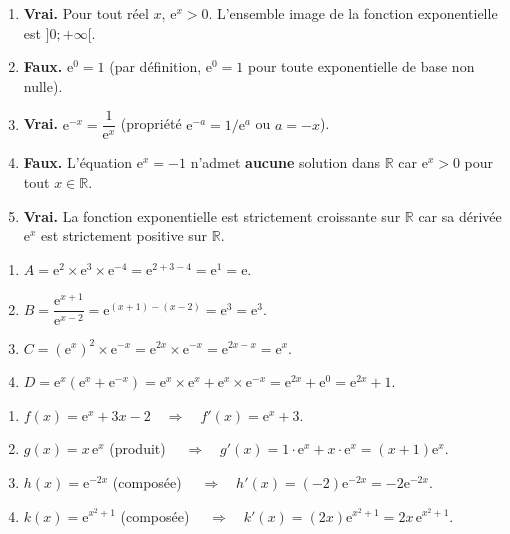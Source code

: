 \documentclass[11pt]{article}
\begin{document}
\begin{corrige}
\begin{enumerate}
\item \textbf{Vrai.} Pour tout réel $x$, $\mathrm{e}^{x} > 0$. L'ensemble image de la fonction exponentielle est $]0;+\infty[$.
\item \textbf{Faux.} $\mathrm{e}^{0} = 1$ (par définition, $\mathrm{e}^{0}=1$ pour toute exponentielle de base non nulle).
\item \textbf{Vrai.} $\mathrm{e}^{-x} = \dfrac{1}{\mathrm{e}^{x}}$ (propriété $\mathrm{e}^{-a} = 1/\mathrm{e}^{a}$ ou $a=-x$).
\item \textbf{Faux.} L'équation $\mathrm{e}^{x}=-1$ n'admet \textbf{aucune} solution dans $\mathbb{R}$ car $\mathrm{e}^{x}>0$ pour tout $x\in\mathbb{R}$.
\item \textbf{Vrai.} La fonction exponentielle est strictement croissante sur $\mathbb{R}$ car sa dérivée $\mathrm{e}^{x}$ est strictement positive sur $\mathbb{R}$.
\end{enumerate}
\end{corrige}

\begin{corrige}
\begin{enumerate}
\item $A = \mathrm{e}^{2}\times \mathrm{e}^{3}\times \mathrm{e}^{-4} = \mathrm{e}^{2+3-4} = \mathrm{e}^{1} = \boxed{\mathrm{e}}$.
\item $B = \dfrac{\mathrm{e}^{x+1}}{\mathrm{e}^{x-2}} = \mathrm{e}^{(x+1)-(x-2)} = \mathrm{e}^{3} = \boxed{\mathrm{e}^{3}}$.
\item $C = \left(\mathrm{e}^{x}\right)^{2}\times \mathrm{e}^{-x} = \mathrm{e}^{2x}\times \mathrm{e}^{-x} = \mathrm{e}^{2x-x} = \boxed{\mathrm{e}^{x}}$.
\item $D = \mathrm{e}^{x}\left(\mathrm{e}^{x}+\mathrm{e}^{-x}\right) = \mathrm{e}^{x}\times\mathrm{e}^{x} + \mathrm{e}^{x}\times\mathrm{e}^{-x} = \mathrm{e}^{2x} + \mathrm{e}^{0} = \boxed{\mathrm{e}^{2x} + 1}$.
\end{enumerate}
\end{corrige}

\begin{corrige}
\begin{enumerate}
\item $f(x)=\mathrm{e}^{x}+3x-2 \quad\Rightarrow\quad f'(x) = \mathrm{e}^{x} + 3$.
\item $g(x)=x\,\mathrm{e}^{x}$ (produit) $\quad\Rightarrow\quad g'(x) = 1\cdot\mathrm{e}^{x} + x\cdot\mathrm{e}^{x} = (x+1)\mathrm{e}^{x}$.
\item $h(x)=\mathrm{e}^{-2x}$ (composée) $\quad\Rightarrow\quad h'(x) = (-2)\mathrm{e}^{-2x} = -2\mathrm{e}^{-2x}$.
\item $k(x)=\mathrm{e}^{x^{2}+1}$ (composée) $\quad\Rightarrow\quad k'(x) = (2x)\mathrm{e}^{x^{2}+1} = 2x\,\mathrm{e}^{x^{2}+1}$.
\end{enumerate}
\end{corrige}
\end{document}
